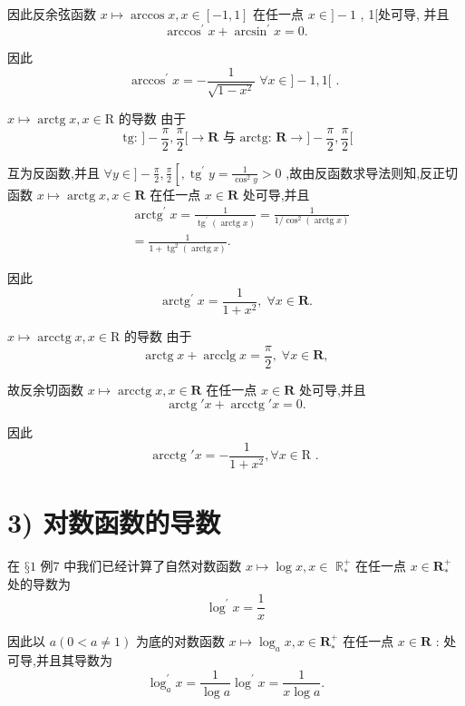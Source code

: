 因此反余弦函数 $x \mapsto  \arccos x,x \in  \left\lbrack  {-1,1}\right\rbrack$ 在任一点 $x \in  \rbrack  - 1$ , 1[处可导, 并且
$${\arccos }^{\prime }x + {\arcsin }^{\prime }x = 0.$$

因此
$${\arccos }^{\prime }x =  - \frac{1}{\sqrt{1 - {x}^{2}}}\;\forall x \in  \rbrack  - 1,1\lbrack \text{ . }$$

$x \mapsto  \operatorname{arctg}x,x \in  \mathrm{R}$ 的导数 由于
$$\text{ tg: }\rbrack  - \frac{\pi }{2},\frac{\pi }{2}\lbrack  \rightarrow  \mathbf{R}\text{ 与 arctg: }\mathbf{R} \rightarrow  \rbrack  - \frac{\pi }{2},\frac{\pi }{2}\lbrack$$

互为反函数,并且 $\forall y \in  \rbrack  - \frac{\pi }{2},\frac{\pi }{2}\left\lbrack  {,{\operatorname{tg}}^{\prime }y = \frac{1}{{\cos }^{2}y} > 0}\right.$ ,故由反函数求导法则知,反正切函数 $x \mapsto  \operatorname{arctg}x,x \in  \mathbf{R}$ 在任一点 $x \in  \mathbf{R}$ 处可导,并且
\begin{align*}
	&{\operatorname{arctg}}^{\prime }x = \frac{1}{{\operatorname{tg}}^{\prime }\left( {\operatorname{arctg}x}\right) } = \frac{1}{1/{\cos }^{2}\left( {\operatorname{arctg}x}\right) }\\
	&= \frac{1}{1 + {\operatorname{tg}}^{2}\left( {\operatorname{arctg}x}\right) }.
\end{align*}

因此
$${\operatorname{arctg}}^{\prime }x = \frac{1}{1 + {x}^{2}},\;\forall x \in  \mathbf{R}.$$

$x \mapsto  \operatorname{arcctg}x,x \in  \mathrm{R}$ 的导数 由于
$$\operatorname{arctg}x + \operatorname{arcclg}x = \frac{\pi }{2},\;\forall x \in  \mathbf{R},$$

故反余切函数 $x \mapsto  \operatorname{arcctg}x,x \in  \mathbf{R}$ 在任一点 $x \in  \mathbf{R}$ 处可导,并且
$$\operatorname{arctg}\prime x + \operatorname{arcctg}\prime x = 0.$$

因此
$$\text{ arcctg }\prime x =  - \frac{1}{1 + {x}^{2}},\forall x \in  \mathrm{R}\text{ . }$$

\section*{3) 对数函数的导数}

在 $§1$ 例7 中我们已经计算了自然对数函数 $x \mapsto  \log x,x \in$  ${\mathbb{R}}_{ * }^{ + }$ 在任一点 $x \in  {\mathbf{R}}_{ * }^{ + }$ 处的导数为
$${\log }^{\prime }x = \frac{1}{x}$$

因此以 $a\left( {0 < a \neq  1}\right)$ 为底的对数函数 $x \mapsto  {\log }_{a}x,x \in  {\mathbf{R}}_{ * }^{ + }$ 在任一点 $x \in  \mathbf{R}$ : 处可导,并且其导数为
$${\log }_{a}^{\prime }x = \frac{1}{\log a}{\log }^{\prime }x = \frac{1}{x\log a}.$$

